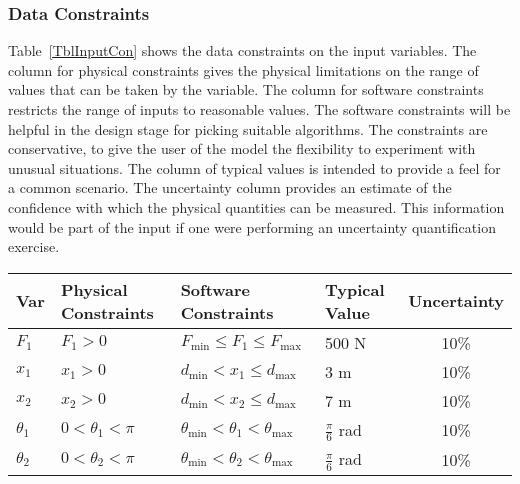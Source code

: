 \documentclass[12pt]{article}
\begin{document}
\subsubsection{Data Constraints} \label{sec_DataConstraints}    

Table~\ref{TblInputCon} shows the data constraints on the input variables.  The 
column for physical constraints gives the physical limitations on the range of 
values that can be taken by the variable. The column for software constraints 
restricts the range of inputs to reasonable values. The software constraints 
will be helpful in the design stage for picking suitable algorithms. The 
constraints are conservative, to give the user of the model the flexibility to 
experiment with unusual situations. The column of typical values is intended to 
provide a feel for a common scenario. The uncertainty column provides an 
estimate of the confidence with which the physical quantities can be measured. 
This information would be part of the input if one were performing an 
uncertainty quantification exercise.

\begin{table}[!h]
  \caption{Input Data Constraints} \label{TblInputCon}
  \renewcommand{\arraystretch}{1.2}
\noindent 
\begin{longtable*}{l l l l c} 
  \toprule
  \textbf{Var} & \textbf{Physical Constraints} & \textbf{Software Constraints} &
                             \textbf{Typical Value} & \textbf{Uncertainty}\\
  \midrule 
  $F_{\text{1}}$ & $F_{\text{1}} > 0$ & $F_{\text{min}} \leq F_{\text{1}} \leq 
  F_{\text{max}}$ & 500 \si{\newton} & 10\%  \\
  $x_{\text{1}}$ & $x_{\text{1}} > 0$ & $d_{\text{min}} < x_{\text{1}} \leq 
  d_{\text{max}}$ & 3 \si{\metre} & 10\%  \\
  $x_{\text{2}}$ & $x_{\text{2}} > 0$ & $d_{\text{min}} < x_{\text{2}} \leq 
  d_{\text{max}}$ & 7 \si{\metre} & 10\%  \\
  $\theta_{\text{1}}$ & $0 < \theta_{\text{1}} < \pi $ & $ \theta_{\text{min}} 
  < \theta_{\text{1}} < \theta_{\text{max}}$ & $\frac{\pi}{6}$ \si{\radian} & 
  10\%  \\
  $\theta_{\text{2}}$ & $0 < \theta_{\text{2}} < \pi $ & $\theta_{\text{min}} < 
  \theta_{\text{2}} < \theta_{\text{max}}$ & $\frac{\pi}{6}$ \si{\radian} & 
  10\%  \\
  \bottomrule
 
\end{longtable*}
\end{table}
\end{document}
